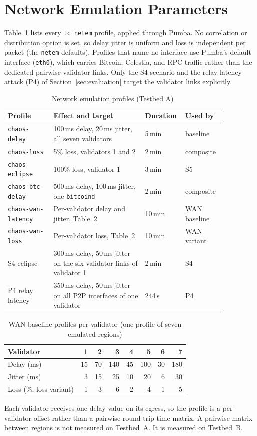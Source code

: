 \section{Network Emulation Parameters}
\label{app:netem}

Table~\ref{tab:netem-profiles} lists every \texttt{tc netem} profile, applied
through Pumba. No correlation or distribution option is set, so delay jitter
is uniform and loss is independent per packet (the \texttt{netem} defaults).
Profiles that name no interface use Pumba's default interface
(\texttt{eth0}), which carries Bitcoin, Celestia, and RPC traffic rather than
the dedicated pairwise validator links. Only the S4 scenario and the relay-latency attack (P4) of
Section~\ref{sec:evaluation} target the validator links explicitly.

\begin{table}[h]
\caption{Network emulation profiles (Testbed A)}
\label{tab:netem-profiles}
\centering
\footnotesize
\begin{tabular}{@{}p{0.2\linewidth}p{0.4\linewidth}p{0.12\linewidth}p{0.14\linewidth}@{}}
\toprule
\textbf{Profile} & \textbf{Effect and target} & \textbf{Duration} & \textbf{Used by} \\
\midrule
\texttt{chaos-delay} & 100\,ms delay, 20\,ms jitter, all seven validators & 5\,min & baseline \\
\texttt{chaos-loss} & 5\% loss, validators 1 and 2 & 2\,min & composite \\
\texttt{chaos-eclipse} & 100\% loss, validator 1 & 3\,min & S5 \\
\texttt{chaos-btc-delay} & 500\,ms delay, 100\,ms jitter, one \texttt{bitcoind} & 2\,min & composite \\
\texttt{chaos-wan-latency} & Per-validator delay and jitter, Table~\ref{tab:netem-wan} & 10\,min & WAN baseline \\
\texttt{chaos-wan-loss} & Per-validator loss, Table~\ref{tab:netem-wan} & 10\,min & WAN variant \\
S4 eclipse & 300\,ms delay, 50\,ms jitter on the six validator links of validator 1 & 2\,min & S4 \\
P4 relay latency & 350\,ms delay, 50\,ms jitter on all P2P interfaces of one validator & 244\,s & P4 \\
\bottomrule
\end{tabular}
\end{table}

\begin{table}[h]
\caption{WAN baseline profiles per validator (one profile of seven emulated regions)}
\label{tab:netem-wan}
\centering
\footnotesize
\begin{tabular}{@{}lrrrrrrr@{}}
\toprule
\textbf{Validator} & 1 & 2 & 3 & 4 & 5 & 6 & 7 \\
\midrule
Delay (ms)  & 15 & 70 & 140 & 45 & 100 & 30 & 180 \\
Jitter (ms) & 3 & 15 & 25 & 10 & 20 & 6 & 30 \\
Loss (\%, loss variant) & 1 & 3 & 6 & 2 & 4 & 1 & 5 \\
\bottomrule
\end{tabular}
\end{table}

Each validator receives one delay value on its egress, so the profile is a
per-validator offset rather than a pairwise round-trip-time matrix. A
pairwise matrix between regions is not measured on Testbed~A.
\iftestbedB It is measured on Testbed~B.\fi
